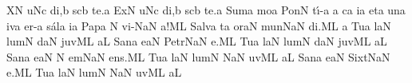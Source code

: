 \initiumgregorianum
{}%
\sgn {}{}X\punctum N\egn
{}u\pes Nc\egn
\sgn di,\punctum b\egn
\spatium
{}s\cephalicus cb\egn
\sgn te.\punctum a\egn
\spatium
\divisiofinalis
\spatium
\sgn {}Ex\chorus\punctum N\egn
{}u\pes Nc\egn
\sgn di,\engl{}\punctum b\egn
\spatium
{}s\cephalicus cb\egn
\sgn te.\punctum a\egn
\spatium
\divisiofinalis
\spatium
\sgn Sum\cantores\punctum a\egn
\sgn mo{}\punctum a\egn
\spatium
\sgn Pon\punctum N\egn
\sgn t{\'\i}-\punctum a\egn
\custos a
\lineaproxima
{}c\punctum a\egn
\sgn {}i{}\punctum a\egn
\spatium
\divisiominima
\spatium
\sgn { }et\punctum a\egn
\spatium
\sgn {}un\punctum a\egn
\sgn {}iv\punctum a\egn
\sgn {}e{r-}\punctum a\egn
\sgn s{\'a}l\punctum a\egn
\sgn {}i{}\punctum a\egn
\spatium
\sgn P{a}p\punctum a\egn
\sgn {}{\ae}{}\punctum N\egn
\spatium
\sgn vi-\torculusdeminutus NaN\egn
{}a!\engl{~}\clivis ML\egn
\spatium
\divisiofinalis
\spatium
\sgn Sa{lv}\punctum a\egn
{}t\punctum a\egn
\sgn {}or\clivis aN\egn
\spatium
\sgn m{u}n\torculusdeminutus NaN\egn
\sgn di.\clivis ML\egn
\spatium
\divisiofinalis
\spatium
\custos a
\lineaproxima
\sgn Tu{}\chorus\punctum a\egn
\spatium
{}l\engl{}\cephalicus aN\egn
\sgn lum\punctum N\egn
\spatium
{}d\cephalicus aN\egn
\sgn juv\clivis ML\egn
\sgn {}a{}\punctum L\egn
\spatium
\divisiofinalis
\spatium
\sgn S{a}n\cantores\punctum a\egn
{}e{}\clivis aN\egn
\spatium
\sgn P{e}{tr}\torculusdeminutus NaN\egn
\sgn {}e.\clivis ML\egn
\spatium
\divisiofinalis
\spatium
\sgn Tu{}\chorus\punctum a\egn
\spatium
{}l\engl{}\cephalicus aN\egn
\sgn lum\punctum N\egn
\spatium
{}d\cephalicus aN\egn
\sgn juv\clivis ML\egn
\sgn {}a{}\punctum L\egn
\spatium
\divisiofinalis
\spatium
\sgn S{a}n\cantores\punctum a\egn
{}e{}\clivis aN\egn
\spatium
\custos N
\lineaproxima
{}em\torculusdeminutus NaN\egn
\sgn {}e{ns.}\clivis ML\egn
\spatium
\divisiofinalis
\spatium
\sgn Tu{}\chorus\punctum a\egn
\spatium
{}l\engl{}\cephalicus aN\egn
\sgn lum\punctum N\egn
\spatium
{}\torculusdeminutus NaN\egn
\sgn {}uv\clivis ML\egn
\sgn {}a{}\punctum L\egn
\spatium
\divisiofinalis
\spatium
\sgn S{a}n\cantores\punctum a\egn
{}e{}\clivis aN\egn
\spatium
\sgn Si{xt}\torculusdeminutus NaN\egn
\sgn {}e.\clivis ML\egn
\spatium
\divisiofinalis
\spatium
\sgn Tu{}\chorus\punctum a\egn
\spatium
{}l\engl{}\cephalicus aN\egn
\sgn lum\punctum N\egn
\spatium
{}\torculusdeminutus NaN\egn
\sgn {}uv\clivis ML\egn
\sgn {}a{}\punctum L\egn
\spatium
\Finisgregoriana



